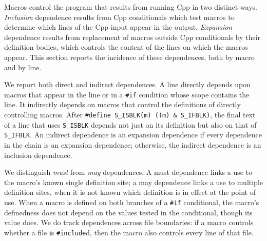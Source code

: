 \documentclass[10pt]{article}
\begin{document}
Macros control the program that results from running Cpp in two distinct
ways.  \emph{Inclusion} dependence results from Cpp conditionals which test
macros to determine which
lines of the Cpp input appear in the output.  \emph{Expansion} dependence
results from replacement of macros outside Cpp conditionals by their
definition bodies, which controls the content of the lines on which the
macros appear.  This section reports the incidence of these dependences,
both by macro and by line.

We report both direct and indirect dependences.  A line directly depends
upon macros that appear in the line or in a {\tt \#if} condition whose
scope contains the line.  It indirectly depends on macros that control the
definitions of directly controlling macros.  After {\tt \#define
\verb|S_ISBLK|(m) ((m)~\&~\verb|S_IFBLK|)}, the final text of a line that
uses \verb|S_ISBLK| depends not just on its definition but also on that of
\verb|S_IFBLK|.  An indirect dependence is an expansion dependence if every
dependence in the chain is an expansion dependence; otherwise, the indirect
dependence is an inclusion dependence.

We distinguish \emph{must} from \emph{may} dependences.  A must dependence links a use
to the macro's known single definition site; a may dependence links a use
to multiple definition sites, when it is not known which definition is in
effect at the point of use.  When a macro is defined on both branches of a
{\tt \#if} conditional, the macro's definedness does not depend on the
values tested in the conditional, though its value does.  We do track
dependences across file boundaries: if a macro controls whether a file is
{\tt \#include}d, then the macro also controls every line of that file.

\end{document}

